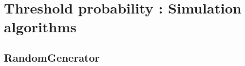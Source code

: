\newpage\section{Threshold  probability :  Simulation algorithms}

\newpage         \subsection{RandomGenerator}


